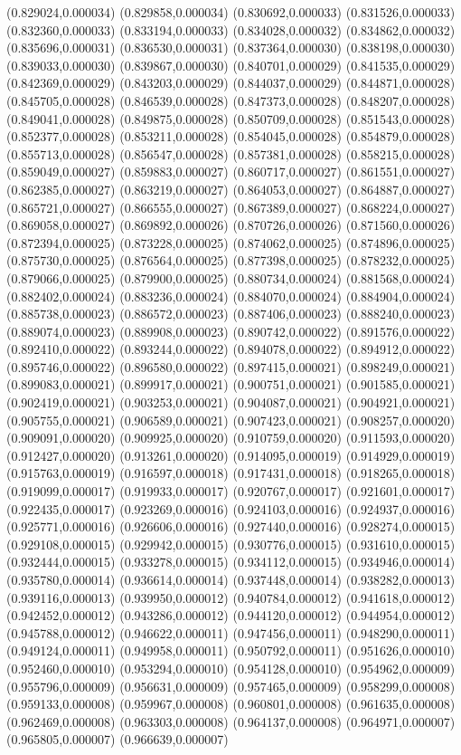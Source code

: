 {(0.829024,0.000034) (0.829858,0.000034) (0.830692,0.000033) (0.831526,0.000033) (0.832360,0.000033) (0.833194,0.000033) (0.834028,0.000032) (0.834862,0.000032) (0.835696,0.000031) (0.836530,0.000031) (0.837364,0.000030) (0.838198,0.000030) (0.839033,0.000030) (0.839867,0.000030) (0.840701,0.000029) (0.841535,0.000029) (0.842369,0.000029) (0.843203,0.000029) (0.844037,0.000029) (0.844871,0.000028) (0.845705,0.000028) (0.846539,0.000028) (0.847373,0.000028) (0.848207,0.000028) (0.849041,0.000028) (0.849875,0.000028) (0.850709,0.000028) (0.851543,0.000028) (0.852377,0.000028) (0.853211,0.000028) (0.854045,0.000028) (0.854879,0.000028) (0.855713,0.000028) (0.856547,0.000028) (0.857381,0.000028) (0.858215,0.000028) (0.859049,0.000027) (0.859883,0.000027) (0.860717,0.000027) (0.861551,0.000027) (0.862385,0.000027) (0.863219,0.000027) (0.864053,0.000027) (0.864887,0.000027) (0.865721,0.000027) (0.866555,0.000027) (0.867389,0.000027) (0.868224,0.000027) (0.869058,0.000027) (0.869892,0.000026) (0.870726,0.000026) (0.871560,0.000026) (0.872394,0.000025) (0.873228,0.000025) (0.874062,0.000025) (0.874896,0.000025) (0.875730,0.000025) (0.876564,0.000025) (0.877398,0.000025) (0.878232,0.000025) (0.879066,0.000025) (0.879900,0.000025) (0.880734,0.000024) (0.881568,0.000024) (0.882402,0.000024) (0.883236,0.000024) (0.884070,0.000024) (0.884904,0.000024) (0.885738,0.000023) (0.886572,0.000023) (0.887406,0.000023) (0.888240,0.000023) (0.889074,0.000023) (0.889908,0.000023) (0.890742,0.000022) (0.891576,0.000022) (0.892410,0.000022) (0.893244,0.000022) (0.894078,0.000022) (0.894912,0.000022) (0.895746,0.000022) (0.896580,0.000022) (0.897415,0.000021) (0.898249,0.000021) (0.899083,0.000021) (0.899917,0.000021) (0.900751,0.000021) (0.901585,0.000021) (0.902419,0.000021) (0.903253,0.000021) (0.904087,0.000021) (0.904921,0.000021) (0.905755,0.000021) (0.906589,0.000021) (0.907423,0.000021) (0.908257,0.000020) (0.909091,0.000020) (0.909925,0.000020) (0.910759,0.000020) (0.911593,0.000020) (0.912427,0.000020) (0.913261,0.000020) (0.914095,0.000019) (0.914929,0.000019) (0.915763,0.000019) (0.916597,0.000018) (0.917431,0.000018) (0.918265,0.000018) (0.919099,0.000017) (0.919933,0.000017) (0.920767,0.000017) (0.921601,0.000017) (0.922435,0.000017) (0.923269,0.000016) (0.924103,0.000016) (0.924937,0.000016) (0.925771,0.000016) (0.926606,0.000016) (0.927440,0.000016) (0.928274,0.000015) (0.929108,0.000015) (0.929942,0.000015) (0.930776,0.000015) (0.931610,0.000015) (0.932444,0.000015) (0.933278,0.000015) (0.934112,0.000015) (0.934946,0.000014) (0.935780,0.000014) (0.936614,0.000014) (0.937448,0.000014) (0.938282,0.000013) (0.939116,0.000013) (0.939950,0.000012) (0.940784,0.000012) (0.941618,0.000012) (0.942452,0.000012) (0.943286,0.000012) (0.944120,0.000012) (0.944954,0.000012) (0.945788,0.000012) (0.946622,0.000011) (0.947456,0.000011) (0.948290,0.000011) (0.949124,0.000011) (0.949958,0.000011) (0.950792,0.000011) (0.951626,0.000010) (0.952460,0.000010) (0.953294,0.000010) (0.954128,0.000010) (0.954962,0.000009) (0.955796,0.000009) (0.956631,0.000009) (0.957465,0.000009) (0.958299,0.000008) (0.959133,0.000008) (0.959967,0.000008) (0.960801,0.000008) (0.961635,0.000008) (0.962469,0.000008) (0.963303,0.000008) (0.964137,0.000008) (0.964971,0.000007) (0.965805,0.000007) (0.966639,0.000007) }
